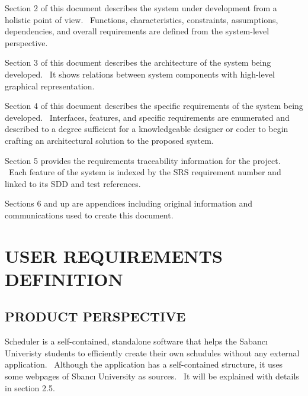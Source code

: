 \documentclass[twoside,letterpaper]{article}
\begin{document}
\begin{flushleft}{\color{black}
Section 2 of this document describes the system under development from a
holistic point of view. \ Functions, characteristics, constraints,
assumptions, dependencies, and overall requirements are defined from
the system-level perspective.}


\bigskip

{\color{black}
Section 3 of this document describes the architecture of the
system being developed. \ It shows relations between system components with high-level graphical representation.}


\bigskip

{\color{black}
Section 4 of this document describes the specific requirements of the
system being developed. \ Interfaces, features, and specific
requirements are enumerated and described to a degree sufficient for a
knowledgeable designer or coder to begin crafting an architectural
solution to the proposed system.}


\bigskip

{\color{black}
Section 5 provides the requirements traceability information for the
project. \ Each feature of the system is indexed by the SRS
requirement number and linked to its SDD and test references.}

\bigskip

{\color{black}
Sections 6 and up are appendices including original information and
communications used to create this document.}\end{flushleft}

\clearpage\section[USER REQUIREMENTS DEFINITION]{\rmfamily\bfseries\color{black}
USER REQUIREMENTS DEFINITION}

\subsection[PRODUCT
PERSPECTIVE]{\rmfamily\bfseries\color{black}
PRODUCT PERSPECTIVE}

{\color{black}
Scheduler is a self-contained, standalone software that helps the Sabanc\i{} Univeristy students to efficiently create their own schudules without any external application. \ Although the application has a self-contained structure, it uses some webpages of Sbanc\i{} University as sources. \ It will be explained with details in section 2.5.}
\end{document}
